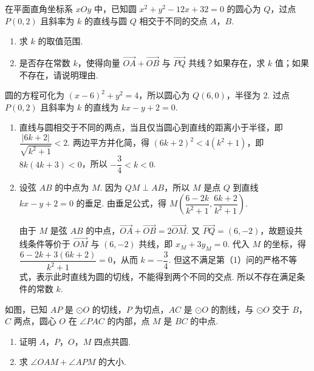 \begin{problem}
在平面直角坐标系 \(xOy\) 中，已知圆 \(x^{2} + y^{2} - 12x + 32 = 0\) 的圆心为 \(Q\)，过点 \(P(0,2)\) 且斜率为 \(k\) 的直线与圆 \(Q\) 相交于不同的交点 \(A\)，\(B\).
\begin{enumerate}
\item 求 \(k\) 的取值范围.
\item 是否存在常数 \(k\)，使得向量 \(\overrightarrow{OA} + \overrightarrow{OB}\) 与 \(\overrightarrow{PQ}\) 共线？如果存在，求 \(k\) 值；如果不存在，请说明理由.
\end{enumerate}
\end{problem}

\begin{solution}
圆的方程可化为 \((x-6)^{2}+y^{2}=4\)，所以圆心为 \(Q(6,0)\)，半径为 \(2\). 过点 \(P(0,2)\) 且斜率为 \(k\) 的直线为 \(kx-y+2=0\).

\begin{enumerate}
\item 直线与圆相交于不同的两点，当且仅当圆心到直线的距离小于半径，即
\(\dfrac{|6k+2|}{\sqrt{k^{2}+1}}<2\). 两边平方并化简，得 \((6k+2)^{2}<4(k^{2}+1)\)，即 \(8k(4k+3)<0\)，所以 \(-\dfrac{3}{4}<k<0\).
\item 设弦 \(AB\) 的中点为 \(M\). 因为 \(QM\perp AB\)，所以 \(M\) 是点 \(Q\) 到直线 \(kx-y+2=0\) 的垂足. 由垂足公式，得
\(M\left(\dfrac{6-2k}{k^{2}+1},\dfrac{6k+2}{k^{2}+1}\right)\).

由于 \(M\) 是弦 \(AB\) 的中点，\(\overrightarrow{OA}+\overrightarrow{OB}=2\overrightarrow{OM}\). 又 \(\overrightarrow{PQ}=(6,-2)\)，故题设共线条件等价于 \(\overrightarrow{OM}\) 与 \((6,-2)\) 共线，即 \(x_M+3y_M=0\). 代入 \(M\) 的坐标，得
\(\dfrac{6-2k+3(6k+2)}{k^{2}+1}=0\)，从而 \(k=-\dfrac{3}{4}\). 但这不满足第（1）问的严格不等式，表示此时直线为圆的切线，不能得到两个不同的交点. 所以不存在满足条件的常数 \(k\).
\end{enumerate}
\end{solution}

\begin{problem}
如图，已知 \(AP\) 是 \(\odot O\) 的切线，\(P\) 为切点，\(AC\) 是 \(\odot O\) 的割线，与 \(\odot O\) 交于 \(B\)，\(C\) 两点，圆心 \(O\) 在 \(\angle PAC\) 的内部，点 \(M\) 是 \(BC\) 的中点.
\begin{enumerate}
\item 证明 \(A\)，\(P\)，\(O\)，\(M\) 四点共圆.
\item 求 \(\angle OAM + \angle APM\) 的大小.
\end{enumerate}

\end{problem}

